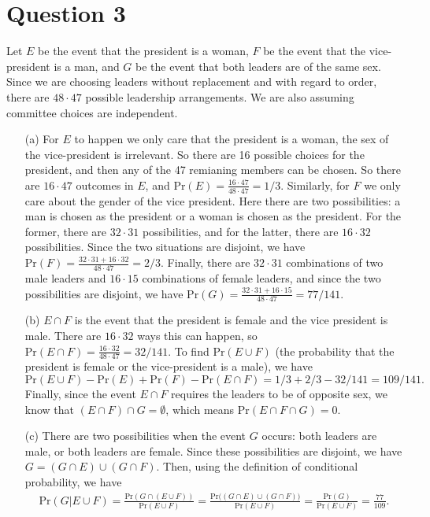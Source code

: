 \documentclass[10pt]{article}
\begin{document}
\section{Question 3} \noindent
Let \(E\) be the event that the president is a woman, \(F\) be the event that the vice-president is a man, and \(G\) be the event that both leaders are of 
the same sex. Since we are choosing leaders without replacement and with regard to order, there are \(48\cdot47\) possible leadership arrangements. We are 
also assuming committee choices are independent. 
\begin{itemize}
    \item[(a)] For \(E\) to happen we only care that the president is a woman, the sex of the vice-president is irrelevant. So there are 16 possible choices 
    for the president, and then any of the 47 remianing members can be chosen. So there are \(16\cdot47\) outcomes in \(E\), and 
    \(\mathrm{Pr}(E) = \frac{16\cdot47}{48\cdot47} = 1/3\). Similarly, for \(F\) we only care about the gender of the vice president. Here there are two
    possibilities: a man is chosen as the president or a woman is chosen as the president. For the former, there are \(32\cdot 31\) possibilities, and for the 
    latter, there are \(16\cdot32\) possibilities. Since the two situations are disjoint, we have \(\mathrm{Pr}(F) = \frac{32\cdot31+16\cdot32}{48\cdot47} 
    = 2/3\). Finally, there are \(32\cdot31\) combinations of two male leaders and \(16\cdot15\) combinations of female leaders, and since the two 
    possibilities are disjoint, we have \(\mathrm{Pr}(G) = \frac{32\cdot31+16\cdot15}{48\cdot47} = 77/141\).
    \item[(b)] \(E\cap F\) is the event that the president is female and the vice president is male. There are \(16\cdot32\) ways this can happen, so 
    \(\mathrm{Pr}(E\cap F) = \frac{16\cdot32}{48\cdot47} = 32/141\). To find \(\mathrm{Pr}(E\cup F)\) (the probability that the president is female or 
    the vice-president is a male), we have \[\mathrm{Pr}(E \cup F) - \mathrm{Pr}(E) + \mathrm{Pr}(F) - \mathrm{Pr}(E\cap F) = 1/3 + 2/3 - 32/141 = 109/141.\]
    Finally, since the event \(E\cap F\) requires the leaders to be of opposite sex, we know that \((E\cap F)\cap G = \emptyset\), which means 
    \(\mathrm{Pr}(E \cap F \cap G) = 0\). 
    \item[(c)] There are two possibilities when the event \(G\) occurs: both leaders are male, or both leaders are female. Since these possibilities are 
    disjoint, we have \(G = (G \cap E) \cup (G \cap F)\). Then, using the definition of conditional probability, we have
    \begin{align*}
        \mathrm{Pr}(G | E \cup F) = \frac{\mathrm{Pr}(G \cap (E \cup F))}{\mathrm{Pr}(E \cup F)} 
        = \frac{\mathrm{Pr}\big( (G \cap E) \cup (G \cap F) \big)}{\mathrm{Pr}(E \cup F)} 
        = \frac{\mathrm{Pr}(G)}{\mathrm{Pr}(E \cup F)} = \frac{77}{109}.
    \end{align*}
\end{itemize}
\end{document}
